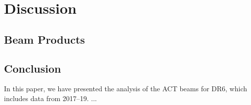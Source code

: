 \section{Discussion}
\label{sec:disc}
\subsection{Beam Products}
\label{subsec:prods}
\subsection{Conclusion}
\label{subsec:concl}
In this paper, we have presented the analysis of the ACT beams for DR6, which includes data from 2017--19. ...
